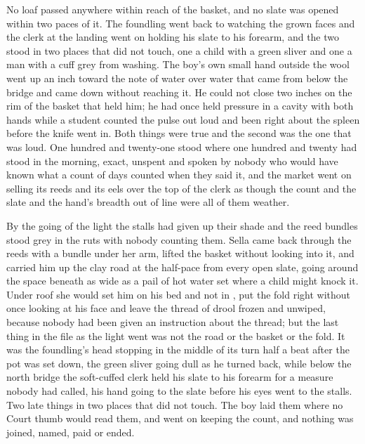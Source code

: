 No loaf passed anywhere within reach of the basket, and no slate was opened within two paces of it. The foundling went back to watching the grown faces and the clerk at the landing went on holding his slate to his forearm, and the two stood in two places that did not touch, one a child with a green sliver and one a man with a cuff grey from washing. The boy's own small hand outside the wool went up an inch toward the note of water over water that came from below the bridge and came down without reaching it. He could not close two inches on the rim of the basket that held him; he had once held pressure in a cavity with both hands while a student counted the pulse out loud and been right about the spleen before the knife went in. Both things were true and the second was the one that was loud. One hundred and twenty-one stood where one hundred and twenty had stood in the morning, exact, unspent and spoken by nobody who would have known what a count of days counted when they said it, and the market went on selling its reeds and its eels over the top of the clerk as though the count and the slate and the hand's breadth out of line were all of them weather.

By the going of the light the stalls had given up their shade and the reed bundles stood grey in the ruts with nobody counting them. Sella came back through the reeds with a bundle under her arm, lifted the basket without looking into it, and carried him up the clay road at the half-pace from every open slate, going around the space beneath  as wide as a pail of hot water set where a child might knock it. Under  roof she would set him on his bed and not in , put the fold right without once looking at his face and leave the thread of drool frozen and unwiped, because nobody had been given an instruction about the thread; but the last thing in the file as the light went was not the road or the basket or the fold. It was the foundling's head stopping in the middle of its turn half a beat after the pot was set down, the green sliver going dull as he turned back, while below the north bridge the soft-cuffed clerk held his slate to his forearm for a measure nobody had called, his hand going to the slate before his eyes went to the stalls. Two late things in two places that did not touch. The boy laid them where no Court thumb would read them, and went on keeping the count, and nothing was joined, named, paid or ended.
